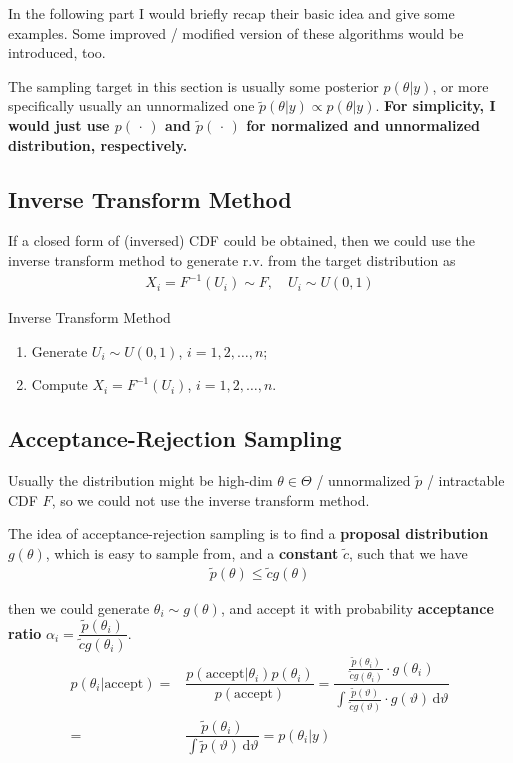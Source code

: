 In the following part I would briefly recap their basic idea and give some examples. Some improved / modified version of these algorithms would be introduced, too.

The sampling target in this section is usually some posterior $ p(\theta |y) $, or more specifically usually an unnormalized one $ \tilde{p}(\theta |y)\propto p(\theta |y) $. \textbf{For simplicity, I would just use $ p(\, \cdot \,  ) $ and $ \tilde{p}(\, \cdot \,  ) $ for normalized and unnormalized distribution, respectively.}


\subsection{Inverse Transform Method}
If a closed form of (inversed) CDF could be obtained, then we could use the inverse transform method to generate r.v. from the target distribution as
\begin{align}
    X_i=F^{-1}(U_i)\sim F,\quad U_i\sim U(0,1) 
\end{align}

\begin{algorithm}{Inverse Transform Method}
    \begin{enumerate}[topsep=2pt,itemsep=0pt]
        \item Generate $ U_i\sim U(0,1) $, $ i=1,2,\ldots,n $;
        \item Compute $ X_i=F^{-1}(U_i) $, $ i=1,2,\ldots,n $.
    \end{enumerate}
\end{algorithm}
    

\subsection{Acceptance-Rejection Sampling}
Usually the distribution might be high-dim $ \theta \in \Theta  $ / unnormalized $ \tilde{p} $ / intractable CDF $ F $, so we could not use the inverse transform method. 

The idea of acceptance-rejection sampling is to find a \textbf{proposal distribution} $ g(\theta ) $, which is easy to sample from, and a \textbf{constant} $ \tilde{c} $, such that we have
\begin{align}
    \tilde{p}(\theta )\leqslant \tilde{c}g(\theta ) 
\end{align}

then we could generate $ \theta_i\sim g(\theta ) $, and accept it with probability \textbf{acceptance ratio} $ \alpha_i=\dfrac{ \tilde{p}(\theta _i) }{ \tilde{c}g(\theta _i) }  $. 
\begin{align}
    p(\theta _i|\text{accept})=&\dfrac{ p(\text{accept}|\theta _i)p(\theta _i) }{ p(\text{accept}) } = \dfrac{ \frac{ \tilde{p}(\theta _i) }{ \tilde{c}g(\theta _i) }\cdot g(\theta _i) }{ \int \frac{ \tilde{p}(\vartheta) }{ \tilde{c}g(\vartheta) }\cdot g(\vartheta) \,\mathrm{d}\vartheta } \\
    = & \dfrac{ \tilde{p}(\theta _i) }{ \int \tilde{p}(\vartheta) \,\mathrm{d}\vartheta } = p(\theta _i|y)
\end{align}

